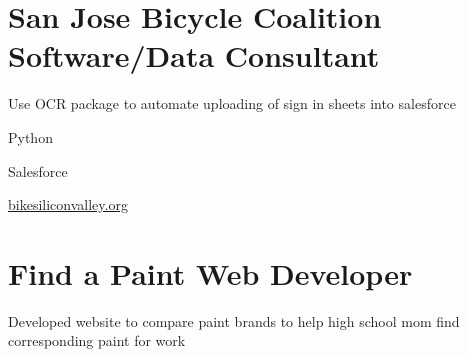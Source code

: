 \section{
    \textbf{San Jose Bicycle Coalition} \newline
    Software/Data Consultant
}{}

\vspace{-2.0ex}

\begin{detail}
    \BulletItem
    Use OCR package to automate uploading of sign in sheets into salesforce
\end{detail}

\begin{subtitle}
    \vspace{-5ex}
    {{}} 
\end{subtitle}

\vspace{-1.5ex}
{
    \vspace{-0.8ex}
    \color{cyan}\small
    {Python}
}

{
    \vspace{-2.5ex}\hspace{1.5in}
    \color{cyan}\small
    {Salesforce}
}

{
    \vspace{-2.5ex}\hspace{3in}
    \color{blue}\small
    {\href{https://bikesiliconvalley.org/}{bikesiliconvalley.org}{}}
}

\vspace{0.5ex}


\section{
    \textbf{Find a Paint} \newline
    Web Developer
}{}

\vspace{-2.5ex}

\begin{detail}
    \BulletItem
    Developed website to compare paint brands to help high school mom find corresponding paint for work
\end{detail}

\begin{subtitle}
    \vspace{-5ex}
    {{}} 
\end{subtitle}

